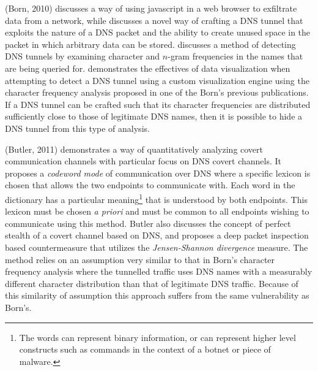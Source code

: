 \documentclass[12pt]{article}
\theoremstyle{remark}
\theoremstyle{definition}
\theoremstyle{definition}
\theoremstyle{definition}
\begin{document}
(Born, 2010)\cite{Born2010.exfil} discusses a way of using javascript in a web
browser to exfiltrate data from a network, while \cite{Born2010.psudp} discusses
a novel way of crafting a DNS tunnel that exploits the nature of a DNS packet
and the ability to create unused space in the packet in which arbitrary data can
be stored. \cite{Born2010.cfa} discusses a method of detecting DNS tunnels by
examining character and $n$-gram frequencies in the names that are being queried
for. \cite{Born2010.ngviz} demonstrates the effectives of data visualization
when attempting to detect a DNS tunnel using a custom visualization engine using
the character frequency analysis proposed in one of the Born's previous
publications. If a DNS tunnel can be crafted such that its character frequencies
are distributed sufficiently close to those of legitimate DNS names, then it is
possible to hide a DNS tunnel from this type of analysis.

(Butler, 2011)\cite{Butler2011} demonstrates a way of quantitatively analyzing
covert communication channels with particular focus on DNS covert channels. It
proposes a \emph{codeword mode} of communication over DNS where a specific
lexicon is chosen that allows the two endpoints to communicate with. Each word
in the dictionary has a particular meaning\footnote{The words can represent
binary information, or can represent higher level constructs such as commands in
the context of a botnet or piece of malware.} that is understood by both
endpoints. This lexicon must be chosen \emph{a priori} and must be common to all
endpoints wishing to communicate using this method. Butler also discusses the
concept of perfect stealth of a covert channel based on DNS, and proposes a deep
packet inspection based countermeasure that utilizes the \emph{Jensen-Shannon
divergence} measure. The method relies on an assumption very similar to that in
Born's character frequency analysis where the tunnelled traffic uses DNS names
with a measurably different character distribution than that of legitimate DNS
traffic. Because of this similarity of assumption this approach suffers from the
same vulnerability as Born's.
\end{document}
